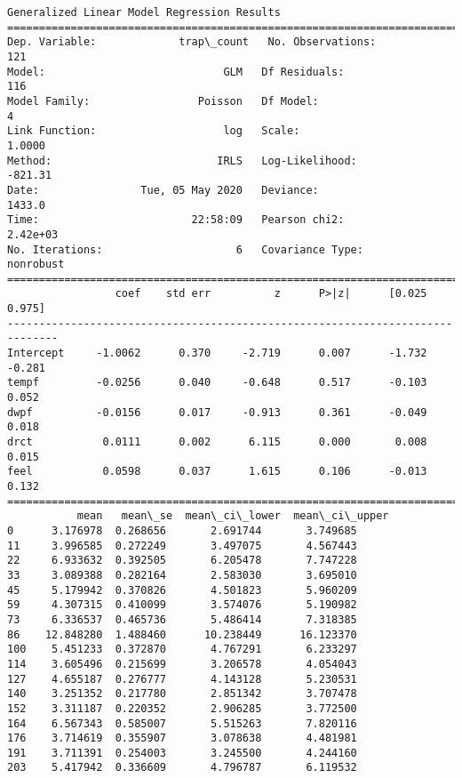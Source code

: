 \documentclass[11pt]{article}
\begin{document}
    \begin{Verbatim}[commandchars=\\\{\}]
                 Generalized Linear Model Regression Results                  
==============================================================================
Dep. Variable:             trap\_count   No. Observations:                  121
Model:                            GLM   Df Residuals:                      116
Model Family:                 Poisson   Df Model:                            4
Link Function:                    log   Scale:                          1.0000
Method:                          IRLS   Log-Likelihood:                -821.31
Date:                Tue, 05 May 2020   Deviance:                       1433.0
Time:                        22:58:09   Pearson chi2:                 2.42e+03
No. Iterations:                     6   Covariance Type:             nonrobust
==============================================================================
                 coef    std err          z      P>|z|      [0.025      0.975]
------------------------------------------------------------------------------
Intercept     -1.0062      0.370     -2.719      0.007      -1.732      -0.281
tempf         -0.0256      0.040     -0.648      0.517      -0.103       0.052
dwpf          -0.0156      0.017     -0.913      0.361      -0.049       0.018
drct           0.0111      0.002      6.115      0.000       0.008       0.015
feel           0.0598      0.037      1.615      0.106      -0.013       0.132
==============================================================================
           mean   mean\_se  mean\_ci\_lower  mean\_ci\_upper
0      3.176978  0.268656       2.691744       3.749685
11     3.996585  0.272249       3.497075       4.567443
22     6.933632  0.392505       6.205478       7.747228
33     3.089388  0.282164       2.583030       3.695010
45     5.179942  0.370826       4.501823       5.960209
59     4.307315  0.410099       3.574076       5.190982
73     6.336537  0.465736       5.486414       7.318385
86    12.848280  1.488460      10.238449      16.123370
100    5.451233  0.372870       4.767291       6.233297
114    3.605496  0.215699       3.206578       4.054043
127    4.655187  0.276777       4.143128       5.230531
140    3.251352  0.217780       2.851342       3.707478
152    3.311187  0.220352       2.906285       3.772500
164    6.567343  0.585007       5.515263       7.820116
176    3.714619  0.355907       3.078638       4.481981
191    3.711391  0.254003       3.245500       4.244160
203    5.417942  0.336609       4.796787       6.119532

\end{Verbatim}
\end{document}
